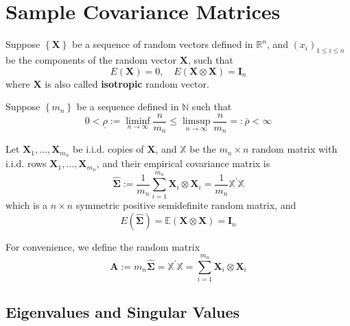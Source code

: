 \chapter{Sample Covariance Matrices}

Suppose $\left\{\mathbf{X}\right\}$ be a sequence of random vectors defined in $\mathbb{R}^{n}$, and $\left(x_{i}\right)_{1\leq i\leq n}$ be the components of the random vector $\mathbf{X}$, such that
\begin{equation*}
    E\left(\mathbf{X}\right)=0,\quad E\left(\mathbf{X}\otimes\mathbf{X}\right)=\mathbf{I}_{n}
\end{equation*}
where $\mathbf{X}$ is also called \textbf{isotropic} random vector.

Suppose $\left\{m_{n}\right\}$ be a sequence defined in $\mathbb{N}$ such that
\begin{equation*}
    0<\underline{\rho}:=\liminf_{n\rightarrow\infty}\frac{n}{m_{n}}\leq\limsup_{n\rightarrow\infty}\frac{n}{m_{n}}=:\bar{\rho}<\infty
\end{equation*}

Let $\mathbf{X}_{1},\ldots,\mathbf{X}_{m_{n}}$ be i.i.d. copies of $\mathbf{X}$, and $\mathbb{X}$ be the $m_{n}\times n$ random matrix with i.i.d. rows $\mathbf{X}_{1},\ldots,\mathbf{X}_{m_{n}}$, and their empirical covariance matrix is
\begin{equation*}
    \widehat{\boldsymbol{\Sigma}}:=\frac{1}{m_{n}}\sum_{i=1}^{m_{n}}\mathbf{X}_{i}\otimes\mathbf{X}_{i}=\frac{1}{m_{n}}\mathbb{X}^{\prime}\mathbb{X}
\end{equation*}
which is a $n\times n$ symmetric positive semidefinite random matrix, and
\begin{equation*}
    E\left(\widehat{\boldsymbol{\Sigma}}\right)=\mathbb{E}\left(\mathbf{X}\otimes\mathbf{X}\right)=\mathbf{I}_{n}
\end{equation*}

For convenience, we define the random matrix
\begin{equation*}
    \mathbf{A}:=m_{n}\widehat{\boldsymbol{\Sigma}}=\mathbb{X}^{\prime}\mathbb{X}=\sum_{i=1}^{m_{n}}\mathbf{X}_{i}\otimes\mathbf{X}_{i}
\end{equation*}

\section{Eigenvalues and Singular Values}

